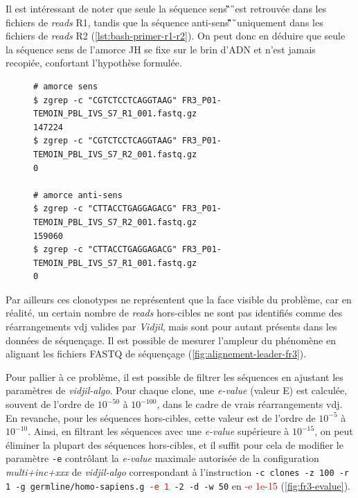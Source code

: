 Il est intéressant de noter que seule la séquence sens
\C\G\T\C\T\C\C\T\C\A\G\G\T\A\A\G\ est retrouvée dans les fichiers de
\textit{reads} R1, tandis que la séquence anti-sens
\C\T\T\A\C\C\T\G\A\G\G\A\G\A\C\G\ uniquement dans les fichiers de
\textit{reads} R2 (\autoref{lst:bash-primer-r1-r2}). On peut donc en déduire
que seule la séquence sens de l'amorce JH se fixe sur le brin d'ADN et n'est
jamais recopiée, confortant l'hypothèse formulée.

\begin{figure}[H]
    \begin{lstlisting}[language=custombash, 
    caption={Commande Bash et résultat de la recherche des séquences des amorces dans les fichiers FASTQ R1 et R2.},
    label={lst:bash-primer-r1-r2},
basicstyle=\ttfamily\small]
# amorce sens
$ zgrep -c "CGTCTCCTCAGGTAAG" FR3_P01-TEMOIN_PBL_IVS_S7_R1_001.fastq.gz
147224
$ zgrep -c "CGTCTCCTCAGGTAAG" FR3_P01-TEMOIN_PBL_IVS_S7_R2_001.fastq.gz
0

# amorce anti-sens
$ zgrep -c "CTTACCTGAGGAGACG" FR3_P01-TEMOIN_PBL_IVS_S7_R2_001.fastq.gz
159060
$ zgrep -c "CTTACCTGAGGAGACG" FR3_P01-TEMOIN_PBL_IVS_S7_R1_001.fastq.gz
0
\end{lstlisting}
\end{figure}

Par ailleurs ces clonotypes ne représentent que la face visible du problème,
car en réalité, un certain nombre de \textit{reads} hors-cibles ne sont pas
identifiés comme des réarrangements \gls{vdj} valides par \textit{Vidjil}, mais
sont pour autant présents dans les données de séquençage. Il est possible de
mesurer l'ampleur du phénomène en alignant les fichiers FASTQ de séquençage
(\autoref{fig:alignement-leader-fr3}).



Pour pallier à ce problème, il est possible de filtrer les séquences en
ajustant les paramètres de \textit{vidjil-algo}. Pour chaque clone, une
\textit{e-value} (valeur E) est calculée, souvent de l'ordre de $10^{-50}$ à
$10^{-100}$, dans le cadre de vrais réarrangements \gls{vdj}. En revanche, pour
les séquences hors-cibles, cette valeur est de l'ordre de $10^{-5}$ à
$10^{-10}$. Ainsi, en filtrant les séquences avec une \textit{e-value}
supérieure à $10^{-15}$, on peut éliminer la plupart des séquences hors-cibles,
et il suffit pour cela de modifier le paramètre \texttt{-e} contrôlant la
\textit{e-value} maximale autorisée de la configuration \textit{multi+inc+xxx}
de \textit{vidjil-algo} correspondant à l'instruction \texttt{-c clones -z 100
-r 1 -g germline/homo-sapiens.g \textcolor{red}{-e 1} -2 -d -w 50} en
\textcolor{red}{-e 1e-15} (\autoref{fig:fr3-evalue}).

